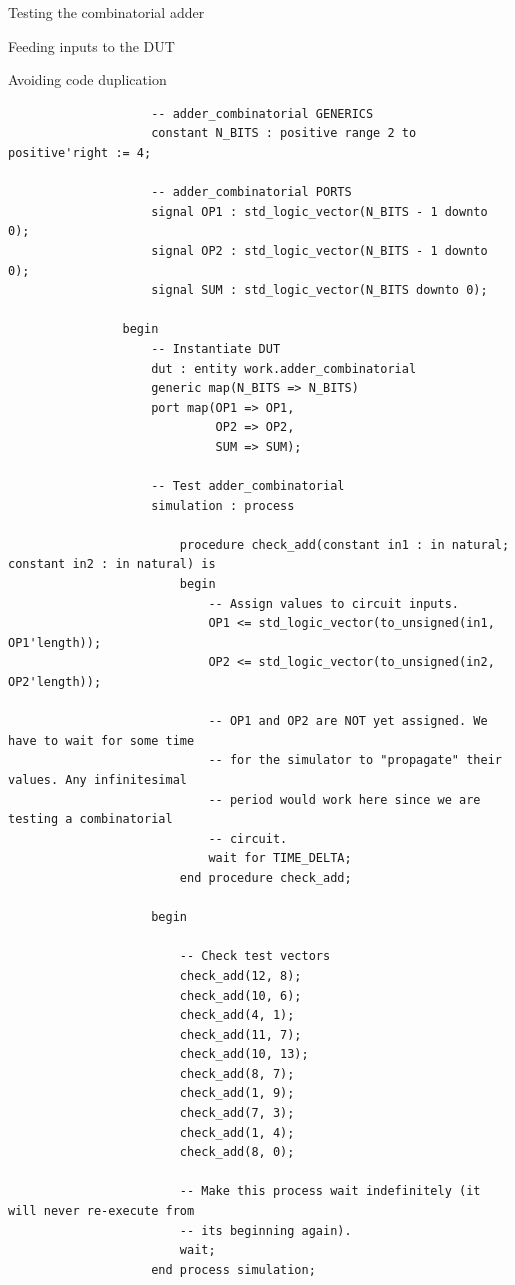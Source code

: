 \documentclass[a4paper, 12pt, onecolumn]{article}
\begin{document}
\begin{section}{Testing the combinatorial adder}
\begin{subsection}{Feeding inputs to the DUT}
\begin{subsubsection}{Avoiding code duplication}
\begin{verbatim}
                    -- adder_combinatorial GENERICS
                    constant N_BITS : positive range 2 to positive'right := 4;

                    -- adder_combinatorial PORTS
                    signal OP1 : std_logic_vector(N_BITS - 1 downto 0);
                    signal OP2 : std_logic_vector(N_BITS - 1 downto 0);
                    signal SUM : std_logic_vector(N_BITS downto 0);

                begin
                    -- Instantiate DUT
                    dut : entity work.adder_combinatorial
                    generic map(N_BITS => N_BITS)
                    port map(OP1 => OP1,
                             OP2 => OP2,
                             SUM => SUM);

                    -- Test adder_combinatorial
                    simulation : process

                        procedure check_add(constant in1 : in natural; constant in2 : in natural) is
                        begin
                            -- Assign values to circuit inputs.
                            OP1 <= std_logic_vector(to_unsigned(in1, OP1'length));
                            OP2 <= std_logic_vector(to_unsigned(in2, OP2'length));

                            -- OP1 and OP2 are NOT yet assigned. We have to wait for some time
                            -- for the simulator to "propagate" their values. Any infinitesimal
                            -- period would work here since we are testing a combinatorial
                            -- circuit.
                            wait for TIME_DELTA;
                        end procedure check_add;

                    begin

                        -- Check test vectors
                        check_add(12, 8);
                        check_add(10, 6);
                        check_add(4, 1);
                        check_add(11, 7);
                        check_add(10, 13);
                        check_add(8, 7);
                        check_add(1, 9);
                        check_add(7, 3);
                        check_add(1, 4);
                        check_add(8, 0);

                        -- Make this process wait indefinitely (it will never re-execute from
                        -- its beginning again).
                        wait;
                    end process simulation;


\end{verbatim}
\end{subsubsection}
\end{subsection}
\end{section}
\end{document}
